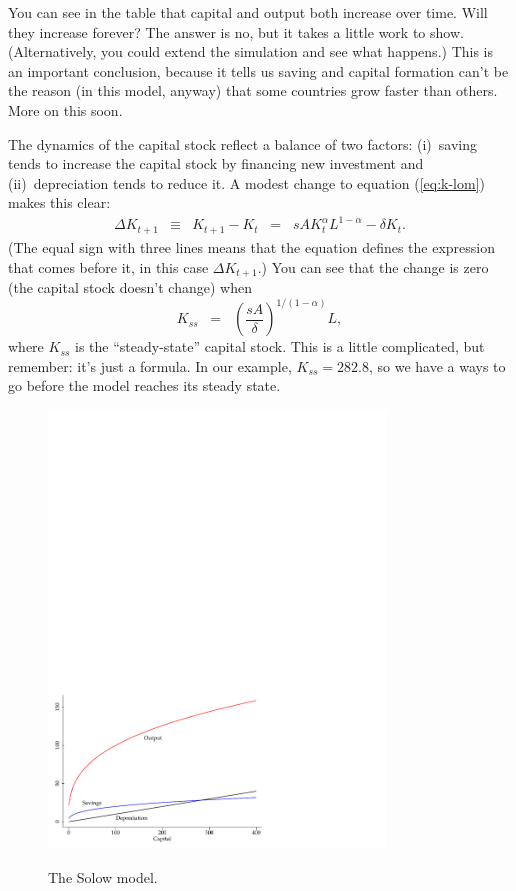 You can see in the table
that capital and output both increase over time.
Will they increase forever?
The answer is no, but it takes a little work to
show. (Alternatively, you could extend the simulation and see what
happens.)
This is an important conclusion, because it tells us saving
and capital formation can't be the reason
(in this model, anyway)
that some countries grow faster than others.  More on this soon.


The dynamics of the capital stock reflect a balance of two factors:
(i)~saving tends to increase the capital stock by financing new investment
and (ii)~depreciation tends to reduce it.
A modest change to equation (\ref{eq:k-lom}) makes this clear:
\begin{eqnarray}
    \Delta K_{t+1} &\equiv& K_{t+1} - K_t
            \;\;=\;\;  s A K_t^\alpha L^{1-\alpha} - \delta K_t .
            \label{eq:dK}
\end{eqnarray}
(The equal sign with three lines means that the equation defines
the expression that comes before it, in this case $\Delta K_{t+1}$.)
You can see that the change is zero (the capital stock doesn't change)
when
\[
    K_{ss} \;\;=\;\; \left( \frac{s A}{\delta} \right)^{1/(1-\alpha)} L ,
\]
where $K_{ss}$ is the ``steady-state'' capital stock.
This is a little complicated, but remember:  it's just a formula.
In our example, $K_{ss} = 282.8$, so we have a ways to go before the model reaches
its steady state.
\begin{figure}[h]
    \caption{The Solow model.}
    \centering
    \includegraphics[width=0.8\textwidth]{Figures/solow1.pdf}\\
    \label{fig:solow1}
\end{figure}

